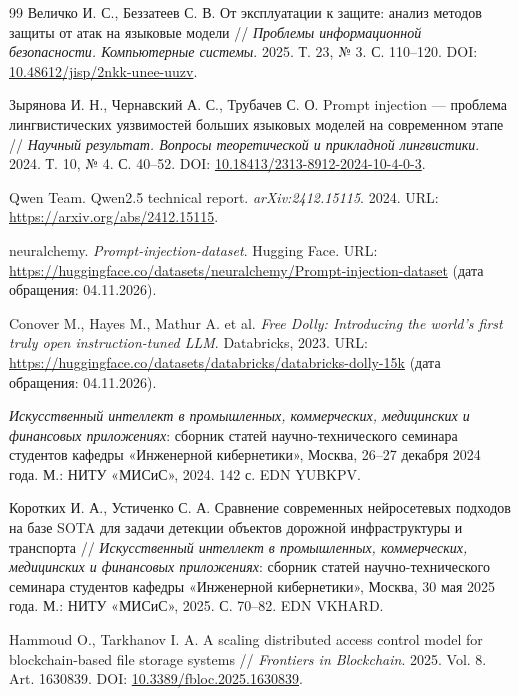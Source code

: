 \documentclass{misisarticle}
\begin{document}
\begin{thebibliography}{99}
 Величко И. С., Беззатеев С. В. От эксплуатации к защите: анализ методов защиты от атак на языковые модели // \textit{Проблемы информационной безопасности. Компьютерные системы}. 2025. Т. 23, № 3. С. 110--120. DOI: \href{https://doi.org/10.48612/jisp/2nkk-unee-uuzv}{10.48612/jisp/2nkk-unee-uuzv}.

 Зырянова И. Н., Чернавский А. С., Трубачев С. О. Prompt injection --- проблема лингвистических уязвимостей больших языковых моделей на современном этапе // \textit{Научный результат. Вопросы теоретической и прикладной лингвистики}. 2024. Т. 10, № 4. С. 40--52. DOI: \href{https://doi.org/10.18413/2313-8912-2024-10-4-0-3}{10.18413/2313-8912-2024-10-4-0-3}.

 Qwen Team. Qwen2.5 technical report. \textit{arXiv:2412.15115}. 2024. URL: \url{https://arxiv.org/abs/2412.15115}.

 neuralchemy. \textit{Prompt-injection-dataset}. Hugging Face. URL: \url{https://huggingface.co/datasets/neuralchemy/Prompt-injection-dataset} (дата обращения: 04.11.2026).

 Conover M., Hayes M., Mathur A. et al. \textit{Free Dolly: Introducing the world's first truly open instruction-tuned LLM}. Databricks, 2023. URL: \url{https://huggingface.co/datasets/databricks/databricks-dolly-15k} (дата обращения: 04.11.2026).

 \textit{Искусственный интеллект в промышленных, коммерческих, медицинских и финансовых приложениях}: сборник статей научно-технического семинара студентов кафедры «Инженерной кибернетики», Москва, 26--27 декабря 2024 года. М.: НИТУ «МИСиС», 2024. 142 с. EDN YUBKPV.

 Коротких И. А., Устиченко С. А. Сравнение современных нейросетевых подходов на базе SOTA для задачи детекции объектов дорожной инфраструктуры и транспорта // \textit{Искусственный интеллект в промышленных, коммерческих, медицинских и финансовых приложениях}: сборник статей научно-технического семинара студентов кафедры «Инженерной кибернетики», Москва, 30 мая 2025 года. М.: НИТУ «МИСиС», 2025. С. 70--82. EDN VKHARD.

 Hammoud O., Tarkhanov I. A. A scaling distributed access control model for blockchain-based file storage systems // \textit{Frontiers in Blockchain}. 2025. Vol. 8. Art. 1630839. DOI: \href{https://doi.org/10.3389/fbloc.2025.1630839}{10.3389/fbloc.2025.1630839}.


\end{thebibliography}
\end{document}
